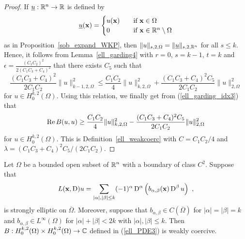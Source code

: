\begin{proof}
If $\underline{u}:\mathbb{R}^n\rightarrow \mathbb{R}$ is defined by
\[
\underline{u}(\mathbf{x}) =
\begin{cases}
u(\mathbf{x}) & \quad \text{if} \ \mathbf{x} \in \Omega \\
0 & \quad \text{if} \ \mathbf{x} \in \mathbb{R}^n \setminus \Omega
\end{cases}
\]
as in Proposition~\ref{sob_expand_WKP}, then
$\|u\|_{s,2,\Omega} = \|\underline{u}\|_{s,2,\mathbb{R}^n}$ for all
$s \leq k$.  Hence, it
follows from Lemma~\ref{ell_garding4} with $r=0$, $s=k-1$, $t=k$
and $\displaystyle \epsilon = \frac{(C_1C_2)^2}{2(C_1C_3 + C_4)^2}$ that
there exists $C_5$ such that
\[
\frac{(C_1C_3 + C_4)^2}{2C_1C_2}\|u\|_{k-1,2,\Omega}^2 \leq 
\frac{C_1C_2}{4} \|u\|_{k,2,\Omega}^2 + \frac{(C_1C_3 + C_4)^2 C_5}{2C_1C_2}
\|u\|_{2,\Omega}^2
\]
for $\displaystyle u \in H^{k,2}_0(\Omega)$.
Using this relation, we finally get from (\ref{ell_garding_idx3}) that
\[
\operatorname{Re} B(u,u) \geq \frac{C_1C_2}{4} \|u\|_{k,2,\Omega}^2
 - \frac{(C_1C_3 + C_4)^2 C_5}{2C_1C_2}\|u\|_{2,\Omega}^2
\]
for $\displaystyle u \in H^{k,2}_0(\Omega)$.
This is Definition~\ref{ell_weakcoerc} with $C=C_1C_2/4$ and
$\lambda = (C_1C_3 + C_4)^2 C_5/(2C_1C_2)$.
\end{proof}

\begin{theorem}  \label{ell_garding1}
Let $\Omega$ be a bounded open subset of $\displaystyle \mathbb{R}^n$ with a
boundary of class $\displaystyle C^2$.  Suppose that
\[
L(\mathbf{x},\operatorname{D})u = \sum_{|\alpha|,|\beta|\leq k} (-1)^\alpha \operatorname{D}^\alpha
\left( b_{\alpha,\beta}(\mathbf{x}) \operatorname{D}^\beta u\right) \  ,
\]
is strongly elliptic on $\overline{\Omega}$.  Moreover, suppose that
$\displaystyle b_{\alpha,\beta} \in C(\overline{\Omega})$ for
$|\alpha|=|\beta|=k$ and
$\displaystyle b_{\alpha,\beta} \in L^\infty(\Omega)$ for
$|\alpha|+|\beta|<2k$ with $|\alpha|,|\beta|\leq k$.  Then 
$\displaystyle B : H^{k,2}_0(\Omega) \times H^{k,2}_0(\Omega)\rightarrow \mathbb{C}$
defined in (\ref{ell_PDE3}) is weakly coercive.
\end{theorem}

